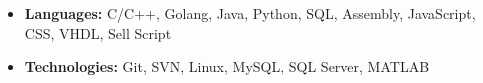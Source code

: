 \documentclass[11pt,a4paper,palatine]{moderncv}        %
\begin{document}
\begin{CJK*}{UTF8}{gbsn}
  {\begin{itemize}
    \item  \textbf{Languages: }C/C++, Golang, Java, Python, SQL, Assembly, JavaScript, CSS, VHDL, Sell Script
    \item  \textbf{Technologies: }Git, SVN, Linux, MySQL, SQL Server, MATLAB
  \end{itemize}
}
\end{CJK*}
\end{document}
